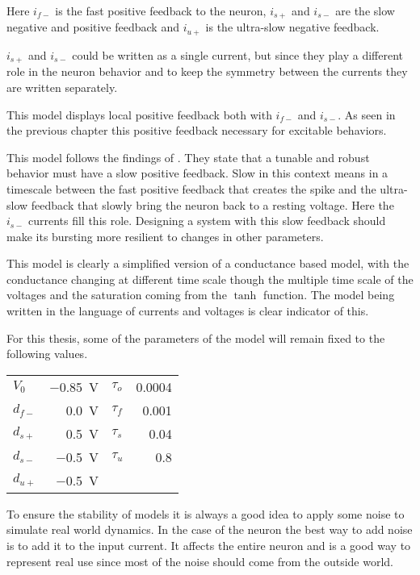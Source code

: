 Here $i_{f-}$ is the fast positive feedback to the neuron, $i_{s+}$ and $i_{s-}$ are the slow negative and positive feedback and $i_{u+}$ is the ultra-slow negative feedback.

$i_{s+}$ and $i_{s-}$ could be written as a single current, but since they play a different role in the neuron behavior and to keep the symmetry between the currents they are written separately.

This model displays local positive feedback both with $i_{f-}$ and $i_{s-}$.
As seen in the previous chapter this positive feedback necessary for excitable behaviors.

This model follows the findings of \citet{burstingSlowFeedback}. 
They state that a tunable and robust behavior must have a slow positive feedback. 
Slow in this context means in a timescale between the fast positive feedback that creates the spike and the ultra-slow feedback that slowly bring the neuron back to a resting voltage.
Here the $i_{s-}$ currents fill this role.
Designing a system with this slow feedback should make its bursting more resilient to changes in other parameters.

This model is clearly a simplified version of a conductance based model, with the conductance changing at different time scale though the multiple time scale of the voltages and the saturation coming from the $\tanh$ function.
The model being written in the language of currents and voltages is clear indicator of this.

For this thesis, some of the parameters of the model will remain fixed to the following values.
{

\large\centering
\begin{tabular}{lr|lr}
    $V_0$    & \qty{-0.85}{\volt} & $\tau_{o}$ & \num{0.0004}\\
    $d_{f-}$ & \qty{0.0}{\volt}   & $\tau_{f}$ & \num{0.001}\\
    $d_{s+}$ & \qty{0.5}{\volt}   & $\tau_{s}$ & \num{0.04}\\
    $d_{s-}$ & \qty{-0.5}{\volt}  & $\tau_{u}$ & \num{0.8}\\
    $d_{u+}$ & \qty{-0.5}{\volt}  & &
\end{tabular}

}

To ensure the stability of models it is always a good idea to apply some noise to simulate real world dynamics.
In the case of the neuron the best way to add noise is to add it to the input current.
It affects the entire neuron and is a good way to represent real use since most of the noise should come from the outside world. 


